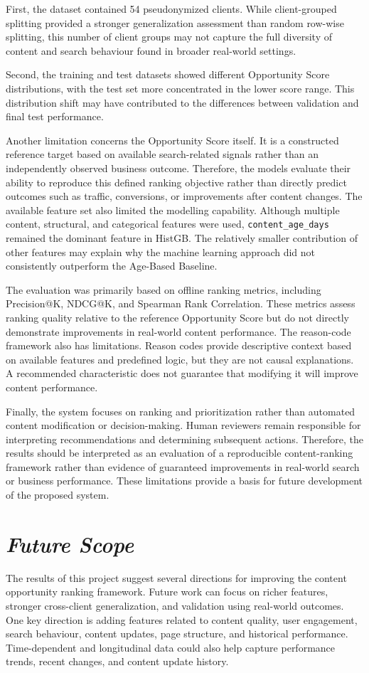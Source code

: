 \documentclass[12pt,a4paper]{report}
\begin{document}
First, the dataset contained 54 pseudonymized clients. While client-grouped splitting provided a stronger generalization assessment than random row-wise splitting, this number of client groups may not capture the full diversity of content and search behaviour found in broader real-world settings. 

Second, the training and test datasets showed different Opportunity Score distributions, with the test set more concentrated in the lower score range. This distribution shift may have contributed to the differences between validation and final test performance.

Another limitation concerns the Opportunity Score itself. It is a constructed reference target based on available search-related signals rather than an independently observed business outcome. Therefore, the models evaluate their ability to reproduce this defined ranking objective rather than directly predict outcomes such as traffic, conversions, or improvements after content changes. The available feature set also limited the modelling capability. Although multiple content, structural, and categorical features were used, \texttt{content\_age\_days} remained the dominant feature in HistGB. The relatively smaller contribution of other features may explain why the machine learning approach did not consistently outperform the Age-Based Baseline.

The evaluation was primarily based on offline ranking metrics, including Precision@K, NDCG@K, and Spearman Rank Correlation. These metrics assess ranking quality relative to the reference Opportunity Score but do not directly demonstrate improvements in real-world content performance. The reason-code framework also has limitations. Reason codes provide descriptive context based on available features and predefined logic, but they are not causal explanations. A recommended characteristic does not guarantee that modifying it will improve content performance.

Finally, the system focuses on ranking and prioritization rather than automated content modification or decision-making. Human reviewers remain responsible for interpreting recommendations and determining subsequent actions. Therefore, the results should be interpreted as an evaluation of a reproducible content-ranking framework rather than evidence of guaranteed improvements in real-world search or business performance. These limitations provide a basis for future development of the proposed system.

\section{\textit{Future Scope}}
The results of this project suggest several directions for improving the content opportunity ranking framework. Future work can focus on richer features, stronger cross-client generalization, and validation using real-world outcomes. One key direction is adding features related to content quality, user engagement, search behaviour, content updates, page structure, and historical performance. Time-dependent and longitudinal data could also help capture performance trends, recent changes, and content update history.
\end{document}
